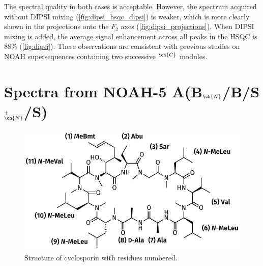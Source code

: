 \documentclass[a4paper,12pt]{article}
\newcommand{\magn}[1]{\ch{^1H}$^{#1}$}
\newcommand{\abnbspns}{NOAH-5 A(B$_{\ch{N}}$/B/S$^{+}_{\ch{N}}$/S)}
\begin{document}
\begin{refsection}
The spectral quality in both cases is acceptable.
However, the spectrum acquired without DIPSI mixing (\cref{fig:dipsi_hsqc_dipsi}) is weaker, which is more clearly shown in the projections onto the $F_2$ axes (\cref{fig:dipsi_projections}).
When DIPSI mixing is added, the average signal enhancement across all peaks in the HSQC is 88\% (\cref{fig:dipsi}).
These observations are consistent with previous studies on NOAH supersequences containing two successive \magn{\ch{C}} modules.\autocite{Yong2021JMR}

\clearpage

\section{Spectra from \texorpdfstring{\abnbspns{}}{NOAH-5 A(Bn/B/Spn/S)}}

\begin{figure}[ht]
    \centering
    \includegraphics[draft=false]{figures/cyclosporin.pdf}%
    \caption[Structure of cyclosporin]{
        Structure of cyclosporin with residues numbered.
    }
    \label{fig:samples_cyclosporin}
\end{figure}


\end{refsection}
\end{document}
